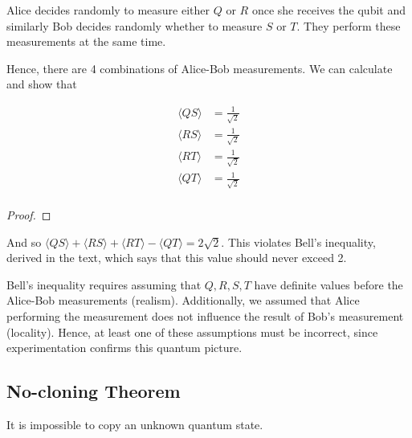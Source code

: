 \documentclass[11pt]{article}
\newcommand\0{\mathbf{0}}
\newcommand\<{\langle}
\renewcommand\>{\rangle}
\begin{document}
Alice decides randomly to measure either $Q$ or $R$ once she receives the qubit and similarly Bob decides randomly whether to measure $S$ or $T$. They perform these measurements at the same time.

Hence, there are 4 combinations of Alice-Bob measurements. We can calculate and show that 

\begin{align*}
\langle QS \rangle &= \frac{1}{\sqrt{2}}\\	
\langle RS \rangle &= \frac{1}{\sqrt{2}}\\	
\langle RT \rangle &= \frac{1}{\sqrt{2}}\\	
\langle QT \rangle &= \frac{1}{\sqrt{2}}\\	
\end{align*}

\begin{proof}
\end{proof}

And so $\langle QS \rangle + \langle RS \rangle + \langle RT \rangle - \langle QT \rangle = 2\sqrt{2}$. This violates Bell's inequality, derived in the text, which says that this value should never exceed 2. 

Bell's inequality requires assuming that $Q,R,S,T$ have definite values before the Alice-Bob measurements (realism). Additionally, we assumed that Alice performing the measurement does not influence the result of Bob's measurement (locality). Hence, at least one of these assumptions must be incorrect, since experimentation confirms this quantum picture.


\subsection{No-cloning Theorem}

It is impossible to copy an unknown quantum state.
\end{document}
